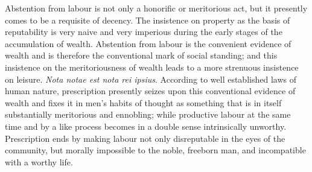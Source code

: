\documentclass[12pt]{report}
\begin{document}
Abstention from labour is not only a honorific or meritorious act,
but it presently comes to be a requisite of decency. The insistence on
property as the basis of reputability is very naive and very imperious
during the early stages of the accumulation of wealth. Abstention
from labour is the convenient evidence of wealth and is therefore
the conventional mark of social standing; and this insistence on the
meritoriousness of wealth leads to a more strenuous insistence on
leisure. \emph{Nota notae est nota rei ipsius}. According to well established
laws of human nature, prescription presently seizes upon this
conventional evidence of wealth and fixes it in men's habits of thought
as something that is in itself substantially meritorious and ennobling;
while productive labour at the same time and by a like process becomes
in a double sense intrinsically unworthy. Prescription ends by making
labour not only disreputable in the eyes of the community, but morally
impossible to the noble, freeborn man, and incompatible with a worthy
life.
\end{document}
